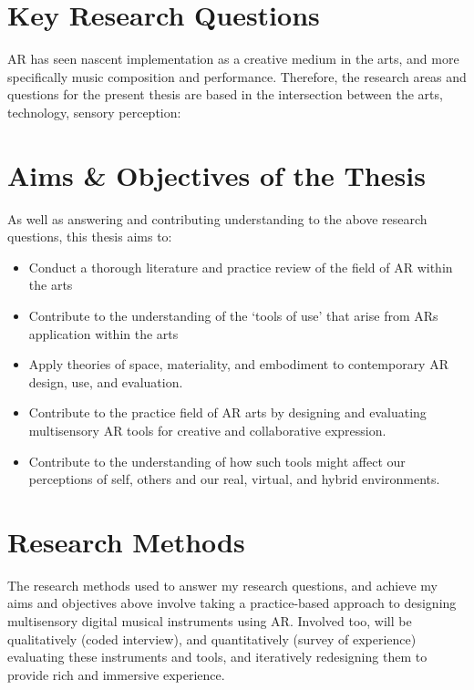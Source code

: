 \section{Key Research Questions}\label{sec: introduction-researchquestions}


AR has seen nascent implementation as a creative medium in the arts, and more specifically music composition and performance. Therefore, the research areas and questions for the present thesis are based in the intersection between the arts, technology, sensory perception:

\RQall

\section{Aims \& Objectives of the Thesis}\label{sec: introduction-aims}
As well as answering and contributing understanding to the above research questions, this thesis aims to:

\begin{itemize}
    \item Conduct a thorough literature and practice review of the field of AR within the arts
    \item Contribute to the understanding of the `tools of use' that arise from ARs application within the arts
    \item Apply theories of space, materiality, and embodiment to contemporary AR design, use, and evaluation.
    \item Contribute to the practice field of AR arts by designing and evaluating multisensory AR tools for creative and collaborative expression.
    \item Contribute to the understanding of how such tools might affect our perceptions of self, others and our real, virtual, and hybrid environments. 
\end{itemize}



\section{Research Methods}\label{sec: introduction-methods}
The research methods used to answer my research questions, and achieve my aims and objectives above involve taking a practice-based approach to designing multisensory digital musical instruments using AR. Involved too, will be qualitatively (coded interview), and quantitatively (survey of experience) evaluating these instruments and tools, and iteratively redesigning them to provide rich and immersive experience.




